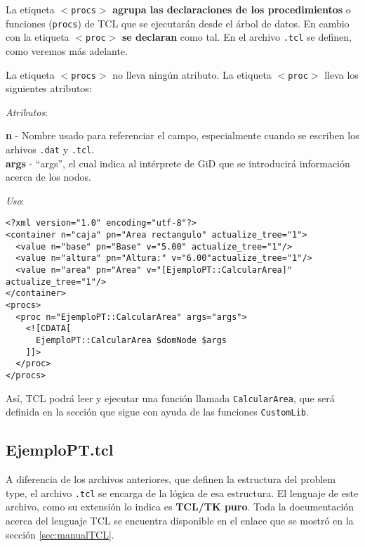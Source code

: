\documentclass[10pt, a4paper, twocolumn]{article} %
\begin{document}
La etiqueta \texttt{$<$procs$>$} \textbf{agrupa las declaraciones de los procedimientos} o funciones (\texttt{procs}) de TCL que se ejecutarán desde el árbol de datos. En cambio con la etiqueta \texttt{$<$proc$>$} \textbf{se declaran} como tal. En el archivo \texttt{.tcl} se definen, como veremos más adelante.

La etiqueta \texttt{$<$procs$>$} no lleva ningún atributo. La etiqueta \texttt{$<$proc$>$} lleva los siguientes atributos:

\vspace{0.15cm}
\textit{Atributos}:

\vspace{0.15cm}
	\textbf{n} - Nombre usado para referenciar el campo, especialmente cuando se escriben los arhivos \texttt{.dat} y \texttt{.tcl}.\\
	\textbf{args} - ``args'', el cual indica al intérprete de GiD que se introducirá información acerca de los nodos.\\
\vspace{0.15cm}

\textit{Uso}:
\vspace{0.15cm}

\lstset{language=XML} 
\begin{lstlisting}[caption={Uso de <procs> y <proc> para invocar rutinas de TCL en XML. Nótese el uso de la función del namespace EjemploPT}]
<?xml version="1.0" encoding="utf-8"?>
<container n="caja" pn="Area rectangulo" actualize_tree="1">
  <value n="base" pn="Base" v="5.00" actualize_tree="1"/>
  <value n="altura" pn="Altura:" v="6.00"actualize_tree="1"/>
  <value n="area" pn="Area" v="[EjemploPT::CalcularArea]" actualize_tree="1"/>
</container>
<procs>
  <proc n="EjemploPT::CalcularArea" args="args">
    <![CDATA[
      EjemploPT::CalcularArea $domNode $args
    ]]>
  </proc>
</procs>
\end{lstlisting}

Así, TCL podrá leer y ejecutar una función llamada \texttt{CalcularArea}, que será definida en la sección que sigue con ayuda de las funciones \texttt{CustomLib}.


\subsection{EjemploPT.tcl}

A diferencia de los archivos anteriores, que definen la estructura del problem type, el archivo \texttt{.tcl} se encarga de la lógica de esa estructura. El lenguaje de este archivo, como su extensión lo indica es \textbf{TCL/TK puro}. Toda la documentación acerca del lenguaje TCL se encuentra disponible en el enlace que se mostró en la sección \ref{sec:manualTCL}.
\end{document}
